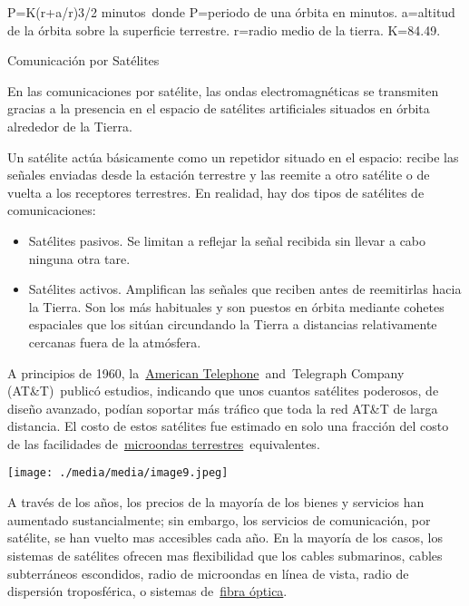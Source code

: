 P=K(r+a/r)3/2 minutos~donde P=periodo de una órbita en minutos.
a=altitud de la órbita sobre la superficie terrestre. r=radio medio de
la tierra. K=84.49.

Comunicación por Satélites

En las comunicaciones por satélite, las ondas electromagnéticas se
transmiten gracias a la presencia en el espacio de satélites
artificiales situados en órbita alrededor de la Tierra.

Un satélite actúa básicamente como un repetidor situado en el espacio:
recibe las señales enviadas desde la estación terrestre y las reemite a
otro satélite o de vuelta a los receptores terrestres. En realidad, hay
dos tipos de satélites de comunicaciones:

\begin{itemize}
\item
  Satélites pasivos. Se limitan a reflejar la señal recibida sin llevar
  a cabo ninguna otra tare.
\item
  Satélites activos. Amplifican las señales que reciben antes de
  reemitirlas hacia la Tierra. Son los más habituales y son puestos en
  órbita mediante cohetes espaciales que los sitúan circundando la
  Tierra a distancias relativamente cercanas fuera de la atmósfera.
\end{itemize}

A principios de 1960,
la~\href{https://www.ecured.cu/index.php?title=American_Telephone\&action=edit\&redlink=1}{American
Telephone}~and~Telegraph Company (AT\&T)~publicó estudios, indicando que
unos cuantos satélites poderosos, de diseño avanzado, podían soportar
más tráfico que toda la red AT\&T de larga distancia. El costo de estos
satélites fue estimado en solo una fracción del costo de las facilidades
de~\href{https://www.ecured.cu/index.php?title=Microondas_terrestres\&action=edit\&redlink=1}{microondas
terrestres}~equivalentes.

\texttt{[image: ./media/media/image9.jpeg]}

A través de los años, los precios de la mayoría de los bienes y
servicios han aumentado sustancialmente; sin embargo, los servicios de
comunicación, por satélite, se han vuelto mas accesibles cada año. En la
mayoría de los casos, los sistemas de satélites ofrecen mas flexibilidad
que los cables submarinos, cables subterráneos escondidos, radio de
microondas en línea de vista, radio de dispersión troposférica, o
sistemas de~\href{https://www.ecured.cu/Fibra_\%C3\%B3ptica}{fibra
óptica}.

